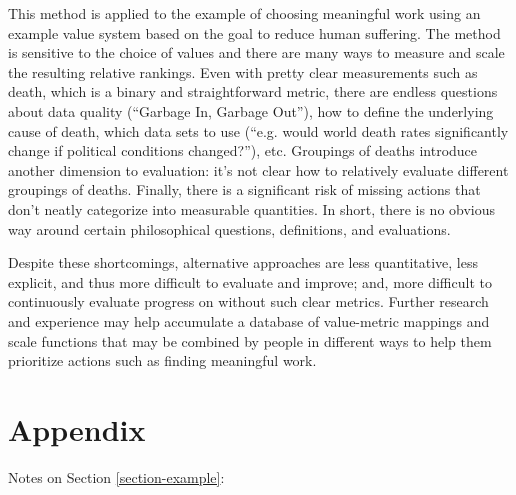 \documentclass[10pt, a4paper, twocolumn]{IEEEconf}
\begin{document}
This method is applied to the example of choosing meaningful work using an example value system based on the goal to reduce human suffering.
The method is sensitive to the choice of values and there are many ways to measure and scale the resulting relative rankings.
Even with pretty clear measurements such as death, which is a binary and straightforward metric, there are endless questions about data quality (\enquote{Garbage In, Garbage Out}), how to define the underlying cause of death, which data sets to use (\enquote{e.g. would world death rates significantly change if political conditions changed?}), etc.
Groupings of deaths introduce another dimension to evaluation: it's not clear how to relatively evaluate different groupings of deaths.
Finally, there is a significant risk of missing actions that don't neatly categorize into measurable quantities.
In short, there is no obvious way around certain philosophical questions, definitions, and evaluations.

Despite these shortcomings, alternative approaches are less quantitative, less explicit, and thus more difficult to evaluate and improve; and, more difficult to continuously evaluate progress on without such clear metrics. Further research and experience may help accumulate a database of value-metric mappings and scale functions that may be combined by people in different ways to help them prioritize actions such as finding meaningful work.




\newpage
\clearpage

\section{Appendix}

Notes on Section \ref{section-example}:
\end{document}
